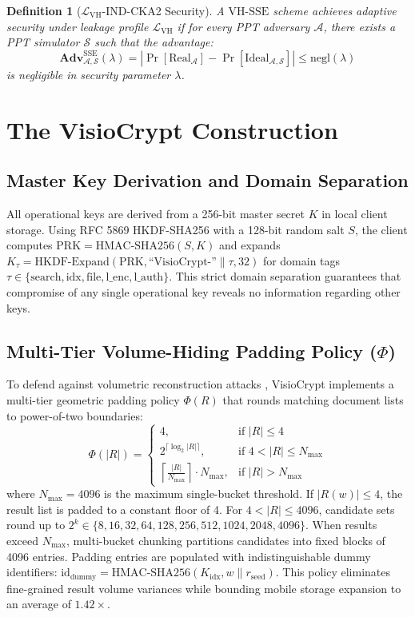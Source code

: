 \documentclass[10pt,conference]{IEEEtran}
\newtheorem{definition}{Definition}
\begin{document}
\begin{definition}[$\mathcal{L}_{\text{VH}}$-IND-CKA2 Security]
A $\text{VH-SSE}$ scheme achieves adaptive security under leakage profile $\mathcal{L}_{\text{VH}}$ if for every PPT adversary $\mathcal{A}$, there exists a PPT simulator $\mathcal{S}$ such that the advantage:
\begin{equation}
\mathbf{Adv}_{\mathcal{A},\mathcal{S}}^{\text{SSE}}(\lambda) = \left| \Pr[\text{Real}_{\mathcal{A}}] - \Pr[\text{Ideal}_{\mathcal{A},\mathcal{S}}] \right| \le \text{negl}(\lambda)
\end{equation}
is negligible in security parameter $\lambda$.
\end{definition}

\section{The VisioCrypt Construction}
\subsection{Master Key Derivation and Domain Separation}
All operational keys are derived from a 256-bit master secret $K$ in local client storage. Using RFC 5869 HKDF-SHA256 with a 128-bit random salt $S$, the client computes $\text{PRK} = \text{HMAC-SHA256}(S, K)$ and expands $K_{\tau} = \text{HKDF-Expand}(\text{PRK}, \text{``VisioCrypt-''}\parallel \tau, 32)$ for domain tags $\tau \in \{\text{search}, \text{idx}, \text{file}, \text{l\_enc}, \text{l\_auth}\}$. This strict domain separation guarantees that compromise of any single operational key reveals no information regarding other keys.

\subsection{Multi-Tier Volume-Hiding Padding Policy ($\Phi$)}
To defend against volumetric reconstruction attacks \cite{kellaris2016,gui2019volume}, VisioCrypt implements a multi-tier geometric padding policy $\Phi(R)$ that rounds matching document lists to power-of-two boundaries:
\begin{equation}
\Phi(|R|) = 
\begin{cases}
4, & \text{if } |R| \le 4 \\
2^{\lceil \log_2 |R| \rceil}, & \text{if } 4 < |R| \le N_{\max} \\
\left\lceil \frac{|R|}{N_{\max}} \right\rceil \cdot N_{\max}, & \text{if } |R| > N_{\max}
\end{cases}
\end{equation}
where $N_{\max} = 4096$ is the maximum single-bucket threshold. If $|R(w)| \le 4$, the result list is padded to a constant floor of 4. For $4 < |R| \le 4096$, candidate sets round up to $2^k \in \{8, 16, 32, 64, 128, 256, 512, 1024, 2048, 4096\}$. When results exceed $N_{\max}$, multi-bucket chunking partitions candidates into fixed blocks of 4096 entries. Padding entries are populated with indistinguishable dummy identifiers: $\text{id}_{\text{dummy}} = \text{HMAC-SHA256}(K_{\text{idx}}, w \parallel r_{\text{seed}})$. This policy eliminates fine-grained result volume variances while bounding mobile storage expansion to an average of $1.42\times$.
\end{document}
